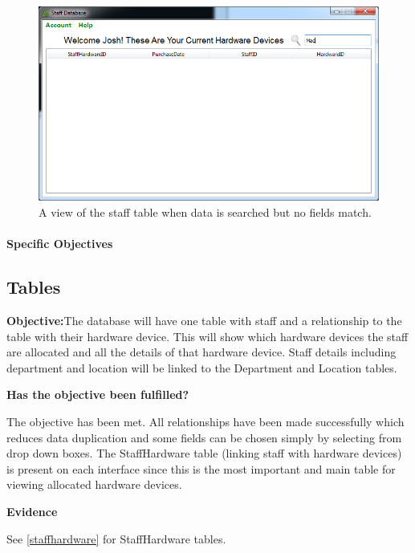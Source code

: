 \begin{figure}[H]
    \includegraphics[width=\textwidth]{./Evaluation/Images/staffsearch2.png}
    \caption{A view of the staff table when data is searched but no fields match.} 
\end{figure}



\paragraph{Specific Objectives}

\subsection{Tables}

\textbf{Objective:}The database will have one table with staff and a relationship to the table with their hardware device. This will show which hardware devices the staff are allocated and all the details of that hardware device. Staff details including department and location will be linked to the Department and Location tables.

\textbf{Has the objective been fulfilled?}

The objective has been met. All relationships have been made successfully which reduces data duplication and some fields can be chosen simply by selecting from drop down boxes. The StaffHardware table (linking staff with hardware devices) is present on each interface since this is the most important and main table for viewing allocated hardware devices.

\textbf{Evidence}

See \ref{staffhardware} for StaffHardware tables.

